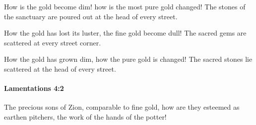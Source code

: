 			\begin{versebox}
					\item[BHS] 
					\item[LXX] 
					\item[ASV] How is the gold become dim! how is the most pure gold changed! The stones of the sanctuary are poured out at the head of every street.
					\item[NIV] How the gold has lost its luster, the fine gold become dull! The sacred gems are scattered at every street corner.
					\item[NRSV] How the gold has grown dim, how the pure gold is changed! The sacred stones lie scattered at the head of every street.
			\end{versebox}

		\paragraph{Lamentations 4:2} %
			\label{LAMENTATIONS-4-2}

			The precious sons of Zion, comparable to fine gold, how are they esteemed as earthen pitchers, the work of the hands of the potter!

